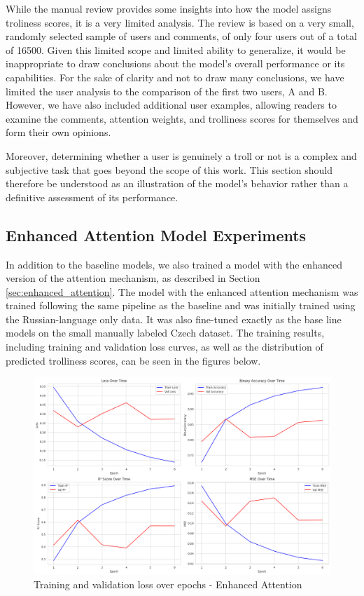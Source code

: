 \documentclass[twoside]{ctuthesis}
\theoremstyle{plain}
\theoremstyle{definition}
\theoremstyle{note}
\begin{document}
While the manual review provides some insights into how the model assigns troliness scores, it is a very limited analysis. The review is based on a very small, randomly selected sample of users and comments, of only four users out of a total of 16500. Given this limited scope and limited ability to generalize, it would be inappropriate to draw conclusions about the model's overall performance or its capabilities. For the sake of clarity and not to draw many conclusions, we have limited the user analysis to the comparison of the first two users, A and B. However, we have also included additional user examples, allowing readers to examine the comments, attention weights, and trolliness scores for themselves and form their own opinions. \par
Moreover, determining whether a user is genuinely a troll or not is a complex and subjective task that goes beyond the scope of this work. This section should therefore be understood as an illustration of the model's behavior rather than a definitive assessment of its performance.\par

\subsection{Enhanced Attention Model Experiments}

In addition to the baseline models, we also trained a model with the enhanced version of the attention mechanism, as described in Section \ref{sec:enhanced_attention}. The model with the enhanced attention mechanism was trained following the same pipeline as the baseline and was initially trained using the Russian-language only data. It was also fine-tuned exactly as the base line models on the small manually labeled Czech dataset. The training results, including training and validation loss curves, as well as the distribution of predicted trolliness scores, can be seen in the figures below.\par 

\begin{figure}[htbp]
  \centering
  \includegraphics[scale=0.33]{figures/training_enhanced.png}
  \caption{Training and validation loss over epochs - Enhanced Attention}
  \label{fig:training_stats_enhanced}
\end{figure}
\end{document}
